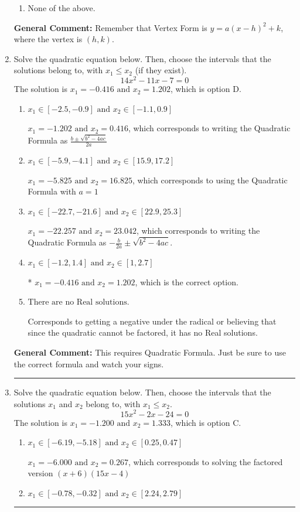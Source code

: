 \documentclass{extbook}[14pt]
\newcommand{\litem}[1]{\item #1

\rule{\textwidth}{0.4pt}}
\begin{document}
\begin{enumerate}
{\begin{enumerate}[label=\Alph*.]
\begin{multicols}{2}
\end{multicols}\item None of the above.\end{enumerate}
\textbf{General Comment:} Remember that Vertex Form is $y = a(x-h)^2+k$, where the vertex is $(h, k)$.
}
\litem{
Solve the quadratic equation below. Then, choose the intervals that the solutions belong to, with $x_1 \leq x_2$ (if they exist).
\[ 14x^{2} -11 x -7 = 0 \]The solution is \( x_1 = -0.416 \text{ and } x_2 = 1.202 \), which is option D.\begin{enumerate}[label=\Alph*.]
\item \( x_1 \in [-2.5, -0.9] \text{ and } x_2 \in [-1.1, 0.9] \)

 $x_1 = -1.202 \text{ and } x_2 = 0.416$, which corresponds to writing the Quadratic Formula as $\frac{b \pm \sqrt{b^2 - 4ac}}{2a}$
\item \( x_1 \in [-5.9, -4.1] \text{ and } x_2 \in [15.9, 17.2] \)

 $x_1 = -5.825 \text{ and } x_2 = 16.825$, which corresponds to using the Quadratic Formula with $a=1$
\item \( x_1 \in [-22.7, -21.6] \text{ and } x_2 \in [22.9, 25.3] \)

 $x_1 = -22.257 \text{ and } x_2 = 23.042$, which corresponds to writing the Quadratic Formula as $-\frac{b}{2a} \pm \sqrt{b^2 - 4ac}$.
\item \( x_1 \in [-1.2, 1.4] \text{ and } x_2 \in [1, 2.7] \)

* $x_1 = -0.416 \text{ and } x_2 = 1.202$, which is the correct option.
\item \( \text{There are no Real solutions.} \)

Corresponds to getting a negative under the radical or believing that since the quadratic cannot be factored, it has no Real solutions.
\end{enumerate}

\textbf{General Comment:} This requires Quadratic Formula. Just be sure to use the correct formula and watch your signs.
}
\litem{
Solve the quadratic equation below. Then, choose the intervals that the solutions $x_1$ and $x_2$ belong to, with $x_1 \leq x_2$.
\[ 15x^{2} -2 x -24 = 0 \]The solution is \( x_1 = -1.200 \text{ and } x_2 = 1.333 \), which is option C.\begin{enumerate}[label=\Alph*.]
\item \( x_1 \in [-6.19, -5.18] \text{ and } x_2 \in [0.25, 0.47] \)

$x_1 = -6.000 \text{ and } x_2 = 0.267$, which corresponds to solving the factored version $(x + 6)(15x -4)$
\item \( x_1 \in [-0.78, -0.32] \text{ and } x_2 \in [2.24, 2.79] \)


\end{enumerate}}
\end{enumerate}
\end{document}
